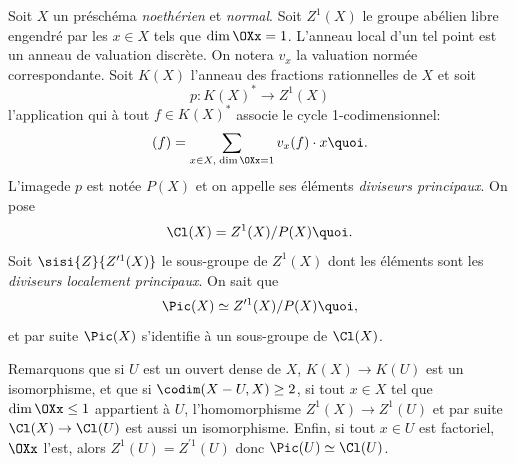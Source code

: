 Soit $X$ un pr\'esch\'ema \emph{noeth\'erien} et \emph{normal}. Soit $Z^1(X)$ le groupe ab\'elien libre engendr\'e par les $x\in X$ tels que $\dim\OXx=1$. L'anneau local d'un tel point est un anneau de valuation discr\`ete. On notera $v_x$ la valuation norm\'ee correspondante. Soit $K(X)$ l'anneau des fractions rationnelles de $X$ et soit
\[
p\colon K(X)^*\to Z^1(X)
\]
l'application qui \`a tout $f\in K(X)^*$ associe le cycle 1-codimensionnel:
\[
(f) = \sum_{x\in X, \;\dim\OXx=1} v_x(f)\cdot x{\quoi}.
\]
L'image\pageoriginale de $p$ est not\'ee $P(X)$ et on appelle ses \'el\'ements \emph{diviseurs principaux}. On pose
\[
\Cl(X) = Z^1(X)/P(X){\quoi}.
\]
Soit $\sisi{Z}{Z^{\prime1}(X)}$ le sous-groupe de $Z^1(X)$ dont les \'el\'ements sont les \emph{diviseurs localement principaux}. On sait que
\[
\Pic(X)\simeq Z^{\prime1}(X)/P(X){\quoi},
\]
et par suite $\Pic(X)$ s'identifie \`a un sous-groupe de $\Cl(X)$.

Remarquons que si $U$ est un ouvert dense de $X$, $K(X)\to K(U)$ est un isomorphisme, et que si $\codim(X-U, X)\geq 2$, \ie si tout $x\in X$ tel que $\dim\OXx\leq 1$ appartient \`a $U$, l'homomorphisme $Z^1(X)\to Z^1(U)$ et par suite $\Cl(X)\to\Cl(U)$ est aussi un isomorphisme. Enfin, si tout $x\in U$ est factoriel, \ie $\OXx$ l'est, alors $Z^1(U) = Z^{\prime1}(U)$ donc $\Pic(U)\simeq\Cl(U)$.

